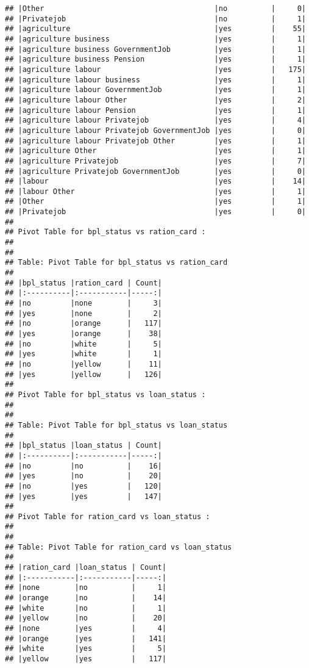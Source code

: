 \documentclass[
]{article}
\begin{document}
\begin{verbatim}
## |Other                                       |no          |     0|
## |Privatejob                                  |no          |     1|
## |agriculture                                 |yes         |    55|
## |agriculture business                        |yes         |     1|
## |agriculture business GovernmentJob          |yes         |     1|
## |agriculture business Pension                |yes         |     1|
## |agriculture labour                          |yes         |   175|
## |agriculture labour business                 |yes         |     1|
## |agriculture labour GovernmentJob            |yes         |     1|
## |agriculture labour Other                    |yes         |     2|
## |agriculture labour Pension                  |yes         |     1|
## |agriculture labour Privatejob               |yes         |     4|
## |agriculture labour Privatejob GovernmentJob |yes         |     0|
## |agriculture labour Privatejob Other         |yes         |     1|
## |agriculture Other                           |yes         |     1|
## |agriculture Privatejob                      |yes         |     7|
## |agriculture Privatejob GovernmentJob        |yes         |     0|
## |labour                                      |yes         |    14|
## |labour Other                                |yes         |     1|
## |Other                                       |yes         |     1|
## |Privatejob                                  |yes         |     0|
## 
## Pivot Table for bpl_status vs ration_card :
## 
## 
## Table: Pivot Table for bpl_status vs ration_card
## 
## |bpl_status |ration_card | Count|
## |:----------|:-----------|-----:|
## |no         |none        |     3|
## |yes        |none        |     2|
## |no         |orange      |   117|
## |yes        |orange      |    38|
## |no         |white       |     5|
## |yes        |white       |     1|
## |no         |yellow      |    11|
## |yes        |yellow      |   126|
## 
## Pivot Table for bpl_status vs loan_status :
## 
## 
## Table: Pivot Table for bpl_status vs loan_status
## 
## |bpl_status |loan_status | Count|
## |:----------|:-----------|-----:|
## |no         |no          |    16|
## |yes        |no          |    20|
## |no         |yes         |   120|
## |yes        |yes         |   147|
## 
## Pivot Table for ration_card vs loan_status :
## 
## 
## Table: Pivot Table for ration_card vs loan_status
## 
## |ration_card |loan_status | Count|
## |:-----------|:-----------|-----:|
## |none        |no          |     1|
## |orange      |no          |    14|
## |white       |no          |     1|
## |yellow      |no          |    20|
## |none        |yes         |     4|
## |orange      |yes         |   141|
## |white       |yes         |     5|
## |yellow      |yes         |   117|
\end{verbatim}
\end{document}
